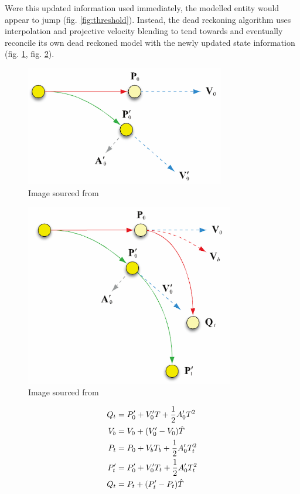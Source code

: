\documentclass[journal]{IEEEtran}
\begin{document}
Were this updated information used immediately, the modelled entity would appear to jump (fig. \ref{fig:threshold}). Instead, the dead reckoning algorithm uses interpolation and projective velocity blending \cite{murphy2011believable} to tend towards and eventually reconcile its own dead reckoned model with the newly updated state information (fig. \ref{fig:dr2}, fig. \ref{fig:dr3}).

\begin{figure}[h]
    \centering
    \includegraphics[width=0.7\linewidth]{DR2.png}
    \caption{Image sourced from \cite{murphy2011believable}}
    \label{fig:dr2}
\end{figure}

\begin{figure}[h]
    \centering
    \includegraphics[width=0.7\linewidth]{DR3.png}
    \caption{Image sourced from \cite{murphy2011believable}}
    \label{fig:dr3}
\end{figure}

\begin{align}
        Q_t & = {P'_0} + {V'_0} T + \frac{1}{2} {A'_0} T^2 \\
        V_b &= V_0 + ({V'_0} - {V_0}) \Hat{T}  \\
        P_t &= P_0 + {V_b}{T_b} + \frac{1}{2} {A'_0} {T_t^2}  \\
        P'_t &= {P'_0} + {V'_0}{T_t} + \frac{1}{2}{A'_0}{T_t^2}\\
        Q_t &= P_t + ({P'_t} - P_t ) \Hat{T} 
\end{align}
\end{document}
